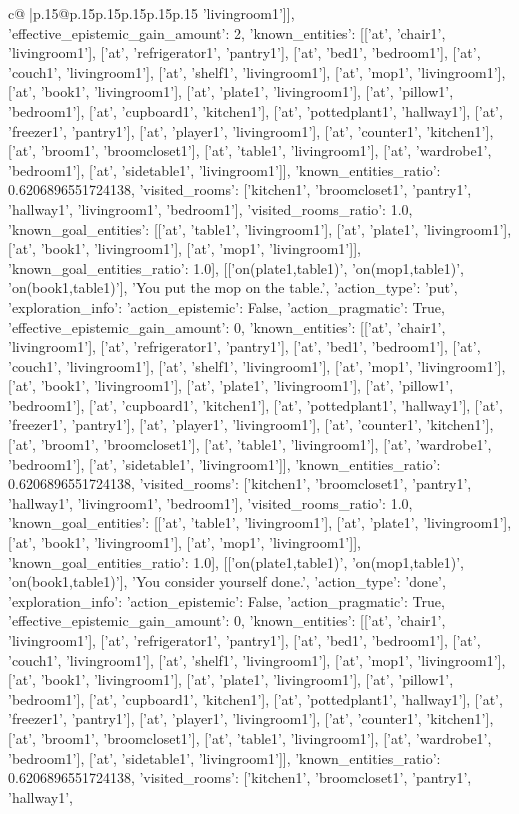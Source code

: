 \documentclass{article}
\begin{document}
{\begin{supertabular}{c@{$\;$}|p{.15\linewidth}@{}p{.15\linewidth}p{.15\linewidth}p{.15\linewidth}p{.15\linewidth}p{.15\linewidth}}
{{{'livingroom1']], 'effective_epistemic_gain_amount': 2, 'known_entities': [['at', 'chair1', 'livingroom1'], ['at', 'refrigerator1', 'pantry1'], ['at', 'bed1', 'bedroom1'], ['at', 'couch1', 'livingroom1'], ['at', 'shelf1', 'livingroom1'], ['at', 'mop1', 'livingroom1'], ['at', 'book1', 'livingroom1'], ['at', 'plate1', 'livingroom1'], ['at', 'pillow1', 'bedroom1'], ['at', 'cupboard1', 'kitchen1'], ['at', 'pottedplant1', 'hallway1'], ['at', 'freezer1', 'pantry1'], ['at', 'player1', 'livingroom1'], ['at', 'counter1', 'kitchen1'], ['at', 'broom1', 'broomcloset1'], ['at', 'table1', 'livingroom1'], ['at', 'wardrobe1', 'bedroom1'], ['at', 'sidetable1', 'livingroom1']], 'known_entities_ratio': 0.6206896551724138, 'visited_rooms': ['kitchen1', 'broomcloset1', 'pantry1', 'hallway1', 'livingroom1', 'bedroom1'], 'visited_rooms_ratio': 1.0, 'known_goal_entities': [['at', 'table1', 'livingroom1'], ['at', 'plate1', 'livingroom1'], ['at', 'book1', 'livingroom1'], ['at', 'mop1', 'livingroom1']], 'known_goal_entities_ratio': 1.0}}], [['on(plate1,table1)', 'on(mop1,table1)', 'on(book1,table1)'], 'You put the mop on the table.', {'action_type': 'put', 'exploration_info': {'action_epistemic': False, 'action_pragmatic': True, 'effective_epistemic_gain_amount': 0, 'known_entities': [['at', 'chair1', 'livingroom1'], ['at', 'refrigerator1', 'pantry1'], ['at', 'bed1', 'bedroom1'], ['at', 'couch1', 'livingroom1'], ['at', 'shelf1', 'livingroom1'], ['at', 'mop1', 'livingroom1'], ['at', 'book1', 'livingroom1'], ['at', 'plate1', 'livingroom1'], ['at', 'pillow1', 'bedroom1'], ['at', 'cupboard1', 'kitchen1'], ['at', 'pottedplant1', 'hallway1'], ['at', 'freezer1', 'pantry1'], ['at', 'player1', 'livingroom1'], ['at', 'counter1', 'kitchen1'], ['at', 'broom1', 'broomcloset1'], ['at', 'table1', 'livingroom1'], ['at', 'wardrobe1', 'bedroom1'], ['at', 'sidetable1', 'livingroom1']], 'known_entities_ratio': 0.6206896551724138, 'visited_rooms': ['kitchen1', 'broomcloset1', 'pantry1', 'hallway1', 'livingroom1', 'bedroom1'], 'visited_rooms_ratio': 1.0, 'known_goal_entities': [['at', 'table1', 'livingroom1'], ['at', 'plate1', 'livingroom1'], ['at', 'book1', 'livingroom1'], ['at', 'mop1', 'livingroom1']], 'known_goal_entities_ratio': 1.0}}], [['on(plate1,table1)', 'on(mop1,table1)', 'on(book1,table1)'], 'You consider yourself done.', {'action_type': 'done', 'exploration_info': {'action_epistemic': False, 'action_pragmatic': True, 'effective_epistemic_gain_amount': 0, 'known_entities': [['at', 'chair1', 'livingroom1'], ['at', 'refrigerator1', 'pantry1'], ['at', 'bed1', 'bedroom1'], ['at', 'couch1', 'livingroom1'], ['at', 'shelf1', 'livingroom1'], ['at', 'mop1', 'livingroom1'], ['at', 'book1', 'livingroom1'], ['at', 'plate1', 'livingroom1'], ['at', 'pillow1', 'bedroom1'], ['at', 'cupboard1', 'kitchen1'], ['at', 'pottedplant1', 'hallway1'], ['at', 'freezer1', 'pantry1'], ['at', 'player1', 'livingroom1'], ['at', 'counter1', 'kitchen1'], ['at', 'broom1', 'broomcloset1'], ['at', 'table1', 'livingroom1'], ['at', 'wardrobe1', 'bedroom1'], ['at', 'sidetable1', 'livingroom1']], 'known_entities_ratio': 0.6206896551724138, 'visited_rooms': ['kitchen1', 'broomcloset1', 'pantry1', 'hallway1', }}}
\end{supertabular}}
\end{document}
